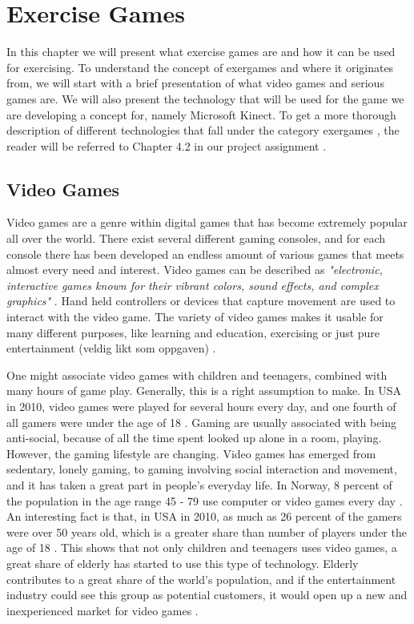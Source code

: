 \chapter{Exercise Games}
In this chapter we will present what exercise games are and how it can be used for exercising. To understand the concept of exergames and where it originates from, we will start with a brief presentation of what video games and serious games are. We will also present the technology that will be used for the game we are developing a concept for, namely Microsoft Kinect. To get a more thorough description of different technologies that fall under the category exergames , the reader will be referred to Chapter 4.2 in our project assignment \cite{project}.

\section{Video Games}

Video games are a genre within digital games that has become extremely popular all over the world. There exist several different gaming consoles, and for each console there has been developed an endless amount of various games that meets almost every need and interest. Video games can be described as \emph{"electronic, interactive games known for their vibrant colors, sound effects, and complex graphics"} \cite{videogamedef}. Hand held controllers or devices that capture movement are used to interact with the video game. The variety of video games makes it usable for many different purposes, like learning and education, exercising or just pure entertainment (veldig likt som oppgaven) \cite{project}. 

One might associate video games with children and teenagers, combined with many hours of game play. Generally, this is a right assumption to make. In USA in 2010, video games were played for several hours every day, and one fourth of all gamers were under the age of 18 \cite{videogames2010}. Gaming are usually associated with being anti-social, because of all the time spent looked up alone in a room, playing. However, the gaming lifestyle are changing. Video games has emerged from sedentary, lonely gaming, to gaming involving social interaction and movement, and it has taken a great part in people's everyday life. In Norway, 8 percent of the population in the age range 45 - 79 use computer or video games every day \cite{mediebarometer2011}. An interesting fact is that, in USA in 2010, as much as 26 percent of the gamers were over 50 years old, which is a greater share than number of players under the age of 18 \cite{videogames2010}. This shows that not only children and teenagers uses video games, a great share of elderly has started to use this type of technology. Elderly contributes to a great share of the world's population, and if the entertainment industry could see this group as potential customers, it would open up a new and inexperienced market for video games \cite{ijsselsteijn2007digital}. 

